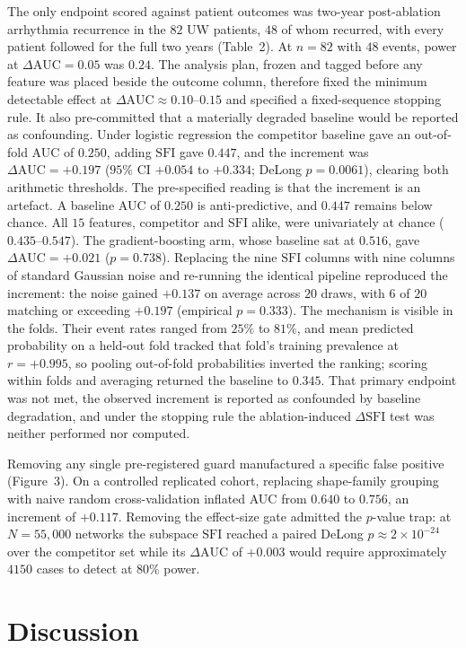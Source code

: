 \documentclass[11pt]{article}
\newcommand{\SFI}{\ensuremath{\mathrm{SFI}}}
\newcommand{\dAUC}{\ensuremath{\Delta\mathrm{AUC}}}
\begin{document}
The only endpoint scored against patient outcomes was two-year post-ablation
arrhythmia recurrence in the $82$ UW patients, $48$ of whom recurred, with every
patient followed for the full two years (Table~2). At $n=82$ with $48$ events,
power at $\dAUC=0.05$ was $0.24$. The analysis plan, frozen and tagged before any
feature was placed beside the outcome column, therefore fixed the minimum
detectable effect at $\dAUC\approx0.10$--$0.15$ and specified a fixed-sequence
stopping rule. It also pre-committed that a materially degraded baseline would be
reported as confounding. Under logistic
regression the competitor baseline gave an out-of-fold AUC of $0.250$, adding
\SFI{} gave $0.447$, and the increment was $\dAUC=+0.197$ ($95\%$ CI $+0.054$ to
$+0.334$; DeLong $p=0.0061$), clearing both arithmetic thresholds. The
pre-specified reading is that the increment is an artefact. A baseline AUC of
$0.250$ is anti-predictive, and $0.447$ remains below chance. All $15$ features,
competitor and \SFI{} alike, were univariately at chance ($0.435$--$0.547$). The
gradient-boosting arm, whose baseline sat at $0.516$, gave $\dAUC=+0.021$
($p=0.738$). Replacing the nine \SFI{} columns with nine columns of standard
Gaussian noise and re-running the identical pipeline reproduced the increment:
the noise gained $+0.137$ on
average across $20$ draws, with $6$ of $20$ matching or exceeding $+0.197$
(empirical $p=0.333$). The mechanism is visible in the folds. Their event rates
ranged from $25\%$ to $81\%$, and mean predicted probability on a held-out fold
tracked that fold's training prevalence at $r=+0.995$, so pooling out-of-fold
probabilities inverted the ranking; scoring within folds and averaging returned
the baseline to $0.345$. That primary endpoint was not met, the
observed increment is reported as confounded by baseline degradation, and under
the stopping rule the ablation-induced $\Delta$\SFI{} test was neither performed
nor computed.

Removing any single pre-registered guard manufactured a specific false positive
(Figure~3). On a controlled replicated cohort, replacing shape-family grouping
with naive random cross-validation inflated AUC from $0.640$ to $0.756$, an
increment of $+0.117$. Removing the effect-size gate admitted the $p$-value trap: at
$N=55{,}000$ networks the subspace \SFI{} reached a paired DeLong
$p\approx2\times10^{-24}$ over the competitor set while its $\dAUC$ of $+0.003$
would require approximately $4150$ cases to detect at $80\%$ power.

\section{Discussion}
\end{document}
